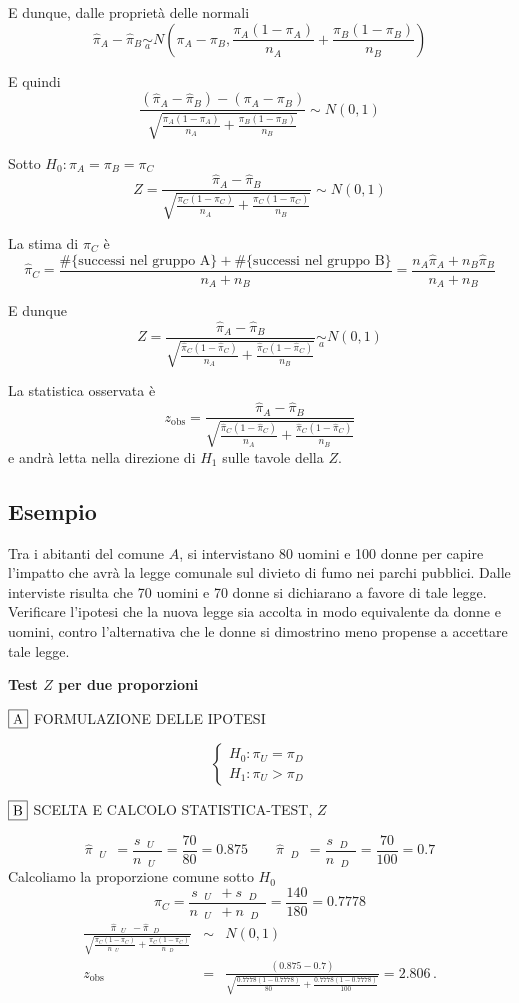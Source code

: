 \documentclass[
  11pt,
]{book}
\theoremstyle{mytheoremstyle}
\theoremstyle{mydefstyle}
\begin{document}
E dunque, dalle proprietà delle normali
\[\hat\pi_A - \hat\pi_B\operatorname*{\sim}_a N\left(\pi_A-\pi_B,\frac{\pi_A(1-\pi_A)}{n_A}+\frac{\pi_B(1-\pi_B)}{n_B}\right)\]

E quindi
\[\frac{(\hat\pi_A - \hat\pi_B)-(\pi_A-\pi_B)}{\sqrt{\frac{\pi_A(1-\pi_A)}{n_A}+\frac{\pi_B(1-\pi_B)}{n_B}}}\sim N(0,1)\]

Sotto \(H_0:\pi_A=\pi_B=\pi_C\)
\[Z=\frac{\hat\pi_A - \hat\pi_B}{\sqrt{\frac{\pi_C(1-\pi_C)}{n_A}+\frac{\pi_C(1-\pi_C)}{n_B}}}\sim N(0,1)\]

La stima di \(\pi_C\) è
\[\hat\pi_C=\frac{\#\{\text{successi nel gruppo A}\}+\#\{\text{successi nel gruppo B}\}}{n_A+n_B}=\frac{n_A\hat\pi_A+n_B\hat\pi_B}{n_A+n_B}\]

E dunque
\[Z=\frac{\hat\pi_A - \hat\pi_B}{\sqrt{\frac{\hat\pi_C(1-\hat\pi_C)}{n_A}+\frac{\hat\pi_C(1-\hat\pi_C)}{n_B}}}\operatorname*{\sim}_a N(0,1)\]

La statistica osservata è
\[z_{\text{obs}}=\frac{\hat\pi_A-\hat\pi_B}{\sqrt{\frac{\hat\pi_C(1-\hat\pi_C)}{n_A}+\frac{\hat\pi_C(1-\hat\pi_C)}{n_B}}}\]
e andrà letta nella direzione di \(H_1\) sulle tavole della \(Z\).

\subsection{Esempio}\label{esempio-5}

Tra i abitanti del comune \(A\), si intervistano 80 uomini e 100 donne
per capire l'impatto che avrà la legge comunale sul divieto di
fumo nei parchi pubblici. Dalle interviste risulta che 70
uomini e 70 donne si dichiarano a favore di tale legge.
Verificare l'ipotesi che la nuova legge sia
accolta in modo equivalente da donne e uomini,
contro l'alternativa che le donne si dimostrino meno
propense a accettare tale legge.

\textbf{Test \(Z\) per due proporzioni}

\(\fbox{A}\) FORMULAZIONE DELLE IPOTESI

\[\begin{cases}
   H_0: \pi_\text{$U$} = \pi_\text{$D$} \\
   H_1: \pi_\text{$U$} > \pi_\text{$D$} 
   \end{cases}\]

\(\fbox{B}\) SCELTA E CALCOLO STATISTICA-TEST, \(Z\)

\[\hat\pi_\text{ $U$ }=\frac{s_\text{ $U$ }}{n_\text{ $U$ }}=\frac{ 70 }{ 80 }= 0.875 \qquad
   \hat\pi_\text{ $D$ }=\frac{s_\text{ $D$ }}{n_\text{ $D$ }}=\frac{ 70 }{ 100 }= 0.7 \]Calcoliamo la proporzione comune sotto \(H_0\)
\[
     \pi_C=\frac{s_\text{ $U$ }+s_\text{ $D$ }}{n_\text{ $U$ }+n_\text{ $D$ }}=
     \frac{ 140 }{ 180 }= 0.7778 
   \]\begin{eqnarray*}
   \frac{\hat\pi_\text{ $U$ } - \hat\pi_\text{ $D$ }}
   {\sqrt{\frac {\pi_C(1-\pi_C)}{n_\text{ $U$ }}+\frac {\pi_C(1-\pi_C)}{n_\text{ $D$ }}}}&\sim&N(0,1)\\
   z_{\text{obs}}
   &=& \frac{ ( 0.875 -  0.7 )} {\sqrt{\frac{ 0.7778 (1- 0.7778 )}{ 80 }+\frac{ 0.7778 (1- 0.7778 )}{ 100 }}}
   =   2.806 \, .
   \end{eqnarray*}
\end{document}
